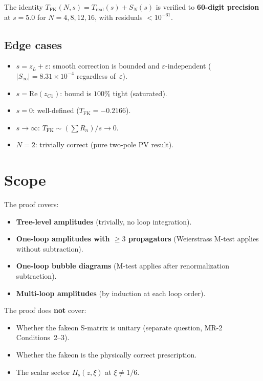 \documentclass[11pt,a4paper]{article}
\newcommand{\Pis}{\Pi_{\mathrm{s}}}
\newcommand{\Real}{\mathrm{Re}}
\begin{document}
The identity $T_{\mathrm{FK}}(N,s) = T_{\mathrm{real}}(s) + S_N(s)$
is verified to \textbf{60-digit precision} at $s = 5.0$ for
$N = 4, 8, 12, 16$, with residuals $< 10^{-61}$.

\subsection{Edge cases}

\begin{itemize}[nosep]
  \item $s = z_L + \varepsilon$: smooth correction is bounded and
    $\varepsilon$-independent ($|S_\infty| = 8.31\times 10^{-4}$
    regardless of~$\varepsilon$).
  \item $s = \Real(z_{C1})$: bound is $100\%$ tight (saturated).
  \item $s = 0$: well-defined ($T_{\mathrm{FK}} = -0.2166$).
  \item $s \to \infty$: $T_{\mathrm{FK}} \sim (\sum R_n)/s \to 0$.
  \item $N = 2$: trivially correct (pure two-pole PV result).
\end{itemize}


\section{Scope}
\label{sec:scope}

The proof covers:
\begin{itemize}[nosep]
  \item \textbf{Tree-level amplitudes} (trivially, no loop integration).
  \item \textbf{One-loop amplitudes with $\geq 3$ propagators}
    (Weierstrass M-test applies without subtraction).
  \item \textbf{One-loop bubble diagrams}
    (M-test applies after renormalization subtraction).
  \item \textbf{Multi-loop amplitudes}
    (by induction at each loop order).
\end{itemize}

The proof does \textbf{not} cover:
\begin{itemize}[nosep]
  \item Whether the fakeon S-matrix is unitary
    (separate question, MR-2 Conditions~2--3).
  \item Whether the fakeon is the physically correct prescription.
  \item The scalar sector $\Pis(z,\xi)$ at $\xi \neq 1/6$.
\end{itemize}
\end{document}

